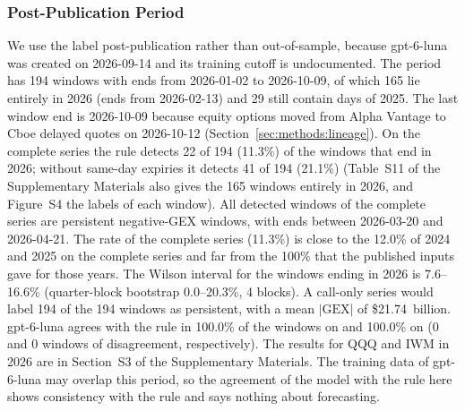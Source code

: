 \subsubsection{Post-Publication Period}
\label{sec:results:post}
We use the label post-publication rather than out-of-sample, because gpt-6-luna was created on 2026-09-14 and its training cutoff is undocumented. The period has 194 windows with ends from 2026-01-02 to 2026-10-09, of which 165 lie entirely in 2026 (ends from 2026-02-13) and 29 still contain days of 2025. The last window end is 2026-10-09 because equity options moved from Alpha Vantage to Cboe delayed quotes on 2026-10-12 (Section~\ref{sec:methods:lineage}). On the complete series the rule detects 22 of 194 (11.3\%) of the windows that end in 2026; without same-day expiries it detects 41 of 194 (21.1\%) (Table~S11 of the Supplementary Materials also gives the 165 windows entirely in 2026, and Figure~S4 the labels of each window). All detected windows of the complete series are persistent negative-GEX windows, with ends between 2026-03-20 and 2026-04-21. The rate of the complete series (11.3\%) is close to the 12.0\% of 2024 and 2025 on the complete series and far from the 100\% that the published inputs gave for those years. The Wilson interval for the windows ending in 2026 is 7.6--16.6\% (quarter-block bootstrap 0.0--20.3\%, 4 blocks). A call-only series would label 194 of the 194 windows as persistent, with a mean $|\mathrm{GEX}|$ of \$21.74~billion. gpt-6-luna agrees with the rule in 100.0\% of the windows on  and 100.0\% on  (0 and 0 windows of disagreement, respectively). The results for QQQ and IWM in 2026 are in Section~S3 of the Supplementary Materials. The training data of gpt-6-luna may overlap this period, so the agreement of the model with the rule here shows consistency with the rule and says nothing about forecasting.
